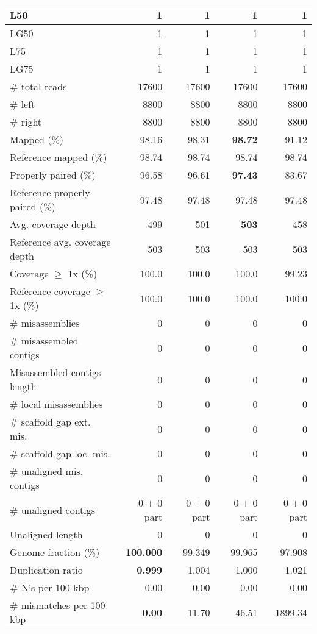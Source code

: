 \documentclass[12pt,a4paper]{article}
\begin{document}
\begin{table}[ht]
\begin{center}
\begin{tabular}{|l*{4}{|r}|}
L50 & 1 & 1 & 1 & 1 \\ \hline
LG50 & 1 & 1 & 1 & 1 \\ \hline
L75 & 1 & 1 & 1 & 1 \\ \hline
LG75 & 1 & 1 & 1 & 1 \\ \hline
\# total reads & 17600 & 17600 & 17600 & 17600 \\ \hline
\# left & 8800 & 8800 & 8800 & 8800 \\ \hline
\# right & 8800 & 8800 & 8800 & 8800 \\ \hline
Mapped (\%) & 98.16 & 98.31 & {\bf 98.72} & 91.12 \\ \hline
Reference mapped (\%) & 98.74 & 98.74 & 98.74 & 98.74 \\ \hline
Properly paired (\%) & 96.58 & 96.61 & {\bf 97.43} & 83.67 \\ \hline
Reference properly paired (\%) & 97.48 & 97.48 & 97.48 & 97.48 \\ \hline
Avg. coverage depth & 499 & 501 & {\bf 503} & 458 \\ \hline
Reference avg. coverage depth & 503 & 503 & 503 & 503 \\ \hline
Coverage $\geq$ 1x (\%) & 100.0 & 100.0 & 100.0 & 99.23 \\ \hline
Reference coverage $\geq$ 1x (\%) & 100.0 & 100.0 & 100.0 & 100.0 \\ \hline
\# misassemblies & 0 & 0 & 0 & 0 \\ \hline
\# misassembled contigs & 0 & 0 & 0 & 0 \\ \hline
Misassembled contigs length & 0 & 0 & 0 & 0 \\ \hline
\# local misassemblies & 0 & 0 & 0 & 0 \\ \hline
\# scaffold gap ext. mis. & 0 & 0 & 0 & 0 \\ \hline
\# scaffold gap loc. mis. & 0 & 0 & 0 & 0 \\ \hline
\# unaligned mis. contigs & 0 & 0 & 0 & 0 \\ \hline
\# unaligned contigs & 0 + 0 part & 0 + 0 part & 0 + 0 part & 0 + 0 part \\ \hline
Unaligned length & 0 & 0 & 0 & 0 \\ \hline
Genome fraction (\%) & {\bf 100.000} & 99.349 & 99.965 & 97.908 \\ \hline
Duplication ratio & {\bf 0.999} & 1.004 & 1.000 & 1.021 \\ \hline
\# N's per 100 kbp & 0.00 & 0.00 & 0.00 & 0.00 \\ \hline
\# mismatches per 100 kbp & {\bf 0.00} & 11.70 & 46.51 & 1899.34 \\ \hline

\end{tabular}
\end{center}
\end{table}
\end{document}
